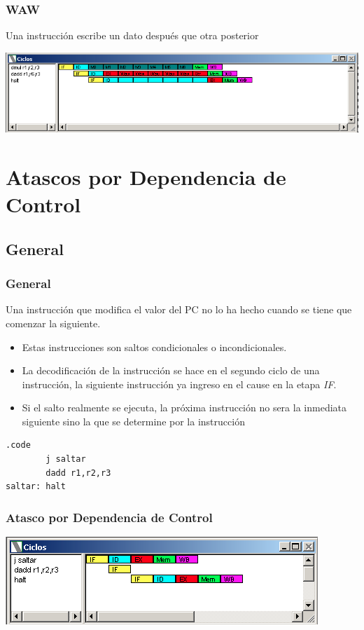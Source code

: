 \documentclass{beamer}
\begin{document}
\begin{frame}[fragile]
\frametitle{WAW}
Una instrucción escribe un dato después que otra posterior
\begin{block}{}
\includegraphics[scale=0.45]{waw.png}
\end{block}
\end{frame}

\section{Atascos por Dependencia de Control}
\subsection{General}
\begin{frame}[fragile]
\frametitle{General}
Una instrucción que modifica el valor del PC no lo ha hecho cuando se tiene que comenzar la siguiente.
\begin{itemize}
\item Estas instrucciones son saltos condicionales o incondicionales.
\item La decodificación de la instrucción se hace en el segundo ciclo de una instrucción, la siguiente instrucción ya ingreso en el cause en la etapa \emph{IF}.
\item Si el salto realmente se ejecuta, la próxima instrucción no sera la inmediata siguiente sino la que se determine por la instrucción
\end{itemize}
\begin{block}{}
\begin{lstlisting}[basicstyle=\ttfamily,keywordstyle=\color{blue}]
        .code
        j saltar
        dadd r1,r2,r3
saltar: halt
\end{lstlisting}
\end{block}
\end{frame}

\begin{frame}[fragile]
\frametitle{Atasco por Dependencia de Control}
\begin{block}{}
\includegraphics[scale=0.45]{atasco-branch-taken.png}
\end{block}
\end{frame}
\end{document}
